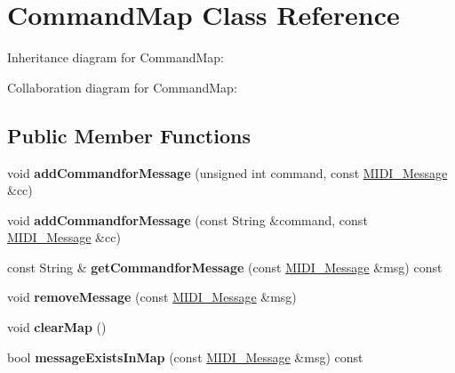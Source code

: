 \hypertarget{class_command_map}{}\section{Command\+Map Class Reference}
\label{class_command_map}


Inheritance diagram for Command\+Map\+:


Collaboration diagram for Command\+Map\+:
\subsection*{Public Member Functions}
\begin{DoxyCompactItemize}
\item 
void {\bfseries add\+Commandfor\+Message} (unsigned int command, const \hyperlink{struct_m_i_d_i___message}{M\+I\+D\+I\+\_\+\+Message} \&cc)\hypertarget{class_command_map_a3b44b67f2167475bba282b8a185018c6}{}\label{class_command_map_a3b44b67f2167475bba282b8a185018c6}

\item 
void {\bfseries add\+Commandfor\+Message} (const String \&command, const \hyperlink{struct_m_i_d_i___message}{M\+I\+D\+I\+\_\+\+Message} \&cc)\hypertarget{class_command_map_a101a5cb39f2f28f16b56a3e782c9daab}{}\label{class_command_map_a101a5cb39f2f28f16b56a3e782c9daab}

\item 
const String \& {\bfseries get\+Commandfor\+Message} (const \hyperlink{struct_m_i_d_i___message}{M\+I\+D\+I\+\_\+\+Message} \&msg) const \hypertarget{class_command_map_aa7b751c5f0b16fb5f552b5c304f56c68}{}\label{class_command_map_aa7b751c5f0b16fb5f552b5c304f56c68}

\item 
void {\bfseries remove\+Message} (const \hyperlink{struct_m_i_d_i___message}{M\+I\+D\+I\+\_\+\+Message} \&msg)\hypertarget{class_command_map_a4965760cbda2b82484b26f5df645c216}{}\label{class_command_map_a4965760cbda2b82484b26f5df645c216}

\item 
void {\bfseries clear\+Map} ()\hypertarget{class_command_map_a628b909ed621f43bc42557bc488a6087}{}\label{class_command_map_a628b909ed621f43bc42557bc488a6087}

\item 
bool {\bfseries message\+Exists\+In\+Map} (const \hyperlink{struct_m_i_d_i___message}{M\+I\+D\+I\+\_\+\+Message} \&msg) const \hypertarget{class_command_map_a72d2cbd00ada2715b07945253f00b8e7}{}\label{class_command_map_a72d2cbd00ada2715b07945253f00b8e7}


\end{DoxyCompactItemize}
